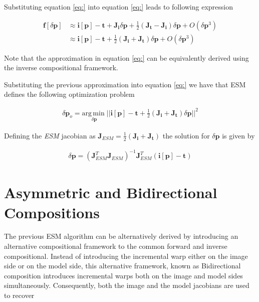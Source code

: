 Substituting equation \ref{eq:} into equation \ref{eq:} leads to following expression

\begin{equation}
	\begin{aligned}
		\mathbf{f}[\delta \mathbf{p}] & \approx \mathbf{i}[\mathbf{p}] - \mathbf{t} + 
		\mathbf{J}_{\mathbf{i}} \delta \mathbf{p} + 
		\frac{1}{2} \left( \mathbf{J}_\mathbf{t} - \mathbf{J}_\mathbf{i} \right) \delta \mathbf{p}+
		O(\delta \mathbf{p}^3)
		\\
		& \approx \mathbf{i}[\mathbf{p}] - \mathbf{t} + 
		\frac{1}{2} \left( \mathbf{J}_\mathbf{i} + \mathbf{J}_\mathbf{t} \right) \delta \mathbf{p}+
		O(\delta \mathbf{p}^3)
	\end{aligned}
\end{equation}

Note that the approximation in equation \ref{eq:} can be equivalently derived using the inverse compositional framework.

Substituting the previous approximation into equation \ref{eq:} we have that ESM defines the following optimization problem

\begin{equation}
	\begin{aligned}
		\delta \mathbf{p}_o = \underset{\delta \mathbf{p}}{\mathrm{arg\,min\;}} 
		|| \mathbf{i}[\mathbf{p}] - \mathbf{t} + \frac{1}{2} \left( \mathbf{J}_\mathbf{i} + \mathbf{J}_\mathbf{t} \right) \delta \mathbf{p} ||^2
	\end{aligned}
\end{equation}

Defining the \emph{ESM} jacobian as $\mathbf{J}_{ESM} = \frac{1}{2} \left( \mathbf{J}_\mathbf{i} + \mathbf{J}_\mathbf{t} \right)$ the solution for $\delta \mathbf{p}$ is given by

\begin{equation}
	\begin{aligned}
		\delta \mathbf{p} = \left( \mathbf{J}^T_{ESM} \mathbf{J}_{ESM} \right)^{-1} \mathbf{J}^T_{ESM} \left( \mathbf{i}[\mathbf{p}] - \mathbf{t} \right)
	\end{aligned}
\end{equation}


\section{Asymmetric and Bidirectional Compositions}

The previous ESM algorithm can be alternatively derived by introducing an alternative compositional framework to the common forward and inverse compositional. Instead of introducing the incremental warp either on the image side or on the model side, this alternative framework, known as Bidirectional composition introduces incremental warps both on the image and model sides simultaneously. Consequently, both the image and the model jacobians are used to recover  

